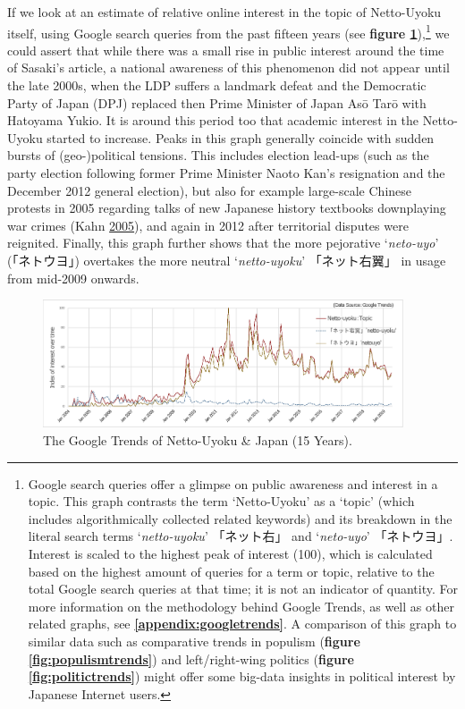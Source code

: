 \documentclass[10pt,british,A4paper,twoside]{memoir}
\begin{document}
If we look at an estimate of relative online interest in the topic of
Netto-Uyoku itself, using Google search queries from the past fifteen
years (see \textbf{figure \ref{fig:nettouyoku}}),\footnote{Google search
  queries offer a glimpse on public awareness and interest in a topic.
  This graph contrasts the term `Netto-Uyoku' as a `topic' (which
  includes algorithmically collected related keywords) and its breakdown
  in the literal search terms `\emph{netto-uyoku}' 「ネット右」 and
  `\emph{neto-uyo}' 「ネトウヨ」. Interest is scaled to the highest peak
  of interest (100), which is calculated based on the highest amount of
  queries for a term or topic, relative to the total Google search
  queries at that time; it is not an indicator of quantity. For more
  information on the methodology behind Google Trends, as well as other
  related graphs, see \textbf{\ref{appendix:googletrends}}. A comparison
  of this graph to similar data such as comparative trends in populism
  (\textbf{figure \ref{fig:populismtrends}}) and left/right-wing
  politics (\textbf{figure \ref{fig:politictrends}}) might offer some
  big-data insights in political interest by Japanese Internet users.}
we could assert that while there was a small rise in public interest
around the time of Sasaki's article, a national awareness of this
phenomenon did not appear until the late 2000s, when the LDP suffers a
landmark defeat and the Democratic Party of Japan (DPJ) replaced then
Prime Minister of Japan Asō Tarō with Hatoyama Yukio. It is around this
period too that academic interest in the Netto-Uyoku started to
increase. Peaks in this graph generally coincide with sudden bursts of
(geo-)political tensions. This includes election lead-ups (such as the
party election following former Prime Minister Naoto Kan's resignation
and the December 2012 general election), but also for example
large-scale Chinese protests in 2005 regarding talks of new Japanese
history textbooks downplaying war crimes (Kahn
\protect\hyperlink{ref-kahn_riot_2005}{2005}), and again in 2012 after
territorial disputes were reignited. Finally, this graph further shows
that the more pejorative `\emph{neto-uyo}' (「ネトウヨ」) overtakes the
more neutral `\emph{netto-uyoku}' 「ネット右翼」 in usage from mid-2009
onwards.

\begin{figure}[!htb]
 \centering
 \caption{\label{fig:nettouyoku} The Google Trends of Netto-Uyoku \& Japan (15 Years).}
 \includegraphics[width=0.95\textwidth,trim=4 4 4 4,clip]{images/nettouyoku2.eps}
\end{figure}
\end{document}
